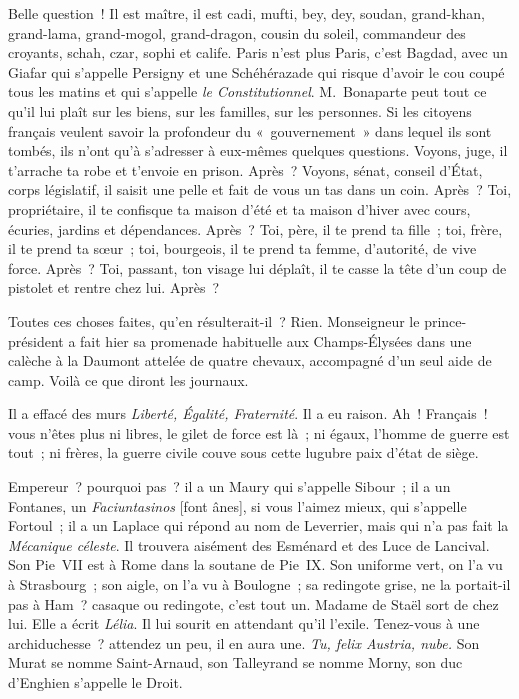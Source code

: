 \documentclass[french,twoside]{book} %
\begin{document}
Belle question ! Il est maître, il est cadi, mufti, bey, dey, soudan, grand-khan, grand-lama, grand-mogol, grand-dragon, cousin du soleil, commandeur des croyants, schah, czar, sophi et calife. Paris n’est plus Paris, c’est Bagdad, avec un Giafar qui s’appelle Persigny et une Schéhérazade qui risque d’avoir le cou coupé tous les matins et qui s’appelle \emph{le Constitutionnel}. M. Bonaparte peut tout ce qu’il lui plaît sur les biens, sur les familles, sur les personnes. Si les citoyens français veulent savoir la profondeur du « gouvernement » dans lequel ils sont tombés, ils n’ont qu’à s’adresser à eux-mêmes quelques questions. Voyons, juge, il t’arrache ta robe et t’envoie en prison. Après ? Voyons, sénat, conseil d’État, corps législatif, il saisit une pelle et fait de vous un tas dans un coin. Après ? Toi, propriétaire, il te confisque ta maison d’été et ta maison d’hiver avec cours, écuries, jardins et dépendances. Après ? Toi, père, il te prend ta fille ; toi, frère, il te prend ta sœur ; toi, bourgeois, il te prend ta femme, d’autorité, de vive force. Après ? Toi, passant, ton visage lui déplaît, il te casse la tête d’un coup de pistolet et rentre chez lui. Après ?\par
Toutes ces choses faites, qu’en résulterait-il ? Rien. Monseigneur le prince-président a fait hier sa promenade habituelle aux Champs-Élysées dans une calèche à la Daumont attelée de quatre chevaux, accompagné d’un seul aide de camp. Voilà ce que diront les journaux.\par
Il a effacé des murs \emph{Liberté, Égalité, Fraternité}. Il a eu raison. Ah ! Français ! vous n’êtes plus ni libres, le gilet de force est là ; ni égaux, l’homme de guerre est tout ; ni frères, la guerre civile couve sous cette lugubre paix d’état de siège.\par
Empereur ? pourquoi pas ? il a un Maury qui s’appelle Sibour ; il a un Fontanes, un \emph{Faciuntasinos} [font ânes], si vous l’aimez mieux, qui s’appelle Fortoul ; il a un Laplace qui répond au nom de Leverrier, mais qui n’a pas fait la \emph{Mécanique céleste}. Il trouvera aisément des Esménard et des Luce de Lancival. Son Pie VII est à Rome dans la soutane de Pie IX. Son uniforme vert, on l’a vu à Strasbourg ; son aigle, on l’a vu à Boulogne ; sa redingote grise, ne la portait-il pas à Ham ? casaque ou redingote, c’est tout un. Madame de Staël sort de chez lui. Elle a écrit \emph{Lélia}. Il lui sourit en attendant qu’il l’exile. Tenez-vous à une archiduchesse ? attendez un peu, il en aura une. \emph{Tu, felix Austria, nube.} Son Murat se nomme Saint-Arnaud, son Talleyrand se nomme Morny, son duc d’Enghien s’appelle le Droit.\par
\end{document}
